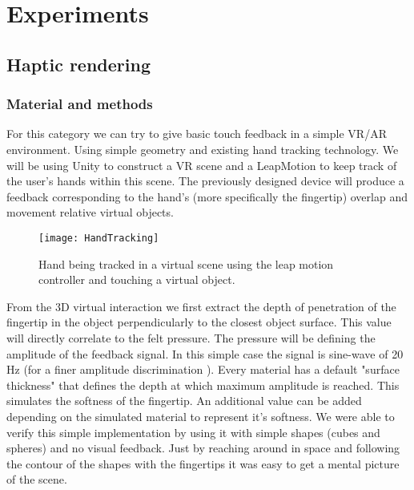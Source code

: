 \documentclass[10pt,journal,compsoc]{IEEEtran}
\begin{document}
  \section{Experiments}
	\subsection{Haptic rendering}
		
		\subsubsection {Material and methods}
		For this category we can try to give basic touch feedback in a simple VR/AR environment. Using simple geometry and existing hand tracking technology.
		We will be using Unity to construct a VR scene and a LeapMotion to keep track of the user's hands within this scene. The previously designed device will produce a feedback corresponding to the hand's (more specifically the fingertip) overlap and movement relative virtual objects. 
		
		\begin{figure}[!t]
		\centering
		\texttt{[image: HandTracking]}
		\caption{Hand being tracked in a virtual scene using the leap motion controller and touching a virtual object.}
		\label{HandTracking}
	\end{figure}
	
	From the 3D virtual interaction we first extract the depth of penetration of the fingertip in the object perpendicularly to the closest object surface. This value will directly correlate to the felt pressure. The pressure will be defining the amplitude of the feedback signal. 
	In this simple case the signal is sine-wave of 20 Hz (for a finer amplitude discrimination \cite{harrison2018tf}). 
	Every material has a default "surface thickness" that defines the depth at which maximum amplitude is reached. This simulates the softness of the fingertip. An additional value can be added depending on the simulated material to represent it's softness.
	We were able to verify this simple implementation by using it with simple shapes (cubes and spheres) and no visual feedback. Just by reaching around in space and following the contour of the shapes with the fingertips it was easy to get a mental picture of the scene.
	
\end{document}
